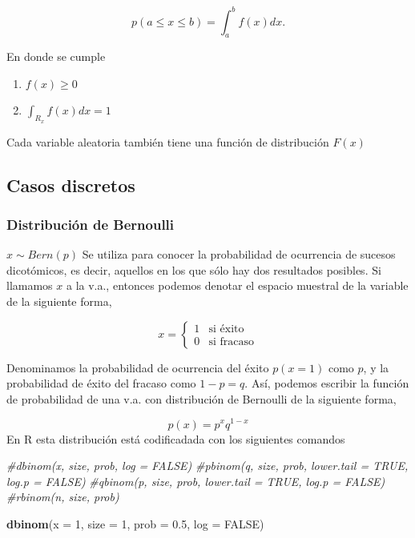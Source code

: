 \documentclass[]{article}
\newenvironment{Shaded}{\begin{snugshade}}{\end{snugshade}}
\newcommand{\CommentTok}[1]{\textcolor[rgb]{0.56,0.35,0.01}{\textit{#1}}}
\newcommand{\DataTypeTok}[1]{\textcolor[rgb]{0.13,0.29,0.53}{#1}}
\newcommand{\DecValTok}[1]{\textcolor[rgb]{0.00,0.00,0.81}{#1}}
\newcommand{\FloatTok}[1]{\textcolor[rgb]{0.00,0.00,0.81}{#1}}
\newcommand{\KeywordTok}[1]{\textcolor[rgb]{0.13,0.29,0.53}{\textbf{#1}}}
\newcommand{\NormalTok}[1]{#1}
\newcommand{\OtherTok}[1]{\textcolor[rgb]{0.56,0.35,0.01}{#1}}
\begin{document}
\[p(a \leq x \leq b) = \int_a^b f(x) dx.\]

En donde se cumple

\begin{enumerate}
\def\labelenumi{\arabic{enumi}.}
\item
  \(f(x) \geq 0\)
\item
  \(\int_{R_x} f(x) dx = 1\)
\end{enumerate}

Cada variable aleatoria también tiene una función de distribución
\(F(x)\)

\hypertarget{casos-discretos}{%
\subsection{Casos discretos}\label{casos-discretos}}

\hypertarget{distribucion-de-bernoulli}{%
\subsubsection{Distribución de
Bernoulli}\label{distribucion-de-bernoulli}}

\(x \sim Bern(p)\) Se utiliza para conocer la probabilidad de ocurrencia
de sucesos dicotómicos, es decir, aquellos en los que sólo hay dos
resultados posibles. Si llamamos \(x\) a la v.a., entonces podemos
denotar el espacio muestral de la variable de la siguiente forma,

\begin{equation}
x = 
\begin{cases} 
1 & \text{si } \mathrm{éxito} \\
0 & \text{si } \mathrm{fracaso}
\end{cases}
\end{equation}

Denominamos la probabilidad de ocurrencia del éxito \(p(x=1)\) como
\(p\), y la probabilidad de éxito del fracaso como \(1-p=q\). Así,
podemos escribir la función de probabilidad de una v.a. con distribución
de Bernoulli de la siguiente forma,

\[p(x) = p^x q^{1-x}\] En R esta distribución está codificadada con los
siguientes comandos

\begin{Shaded}
\begin{Highlighting}[]
\CommentTok{#dbinom(x, size, prob, log = FALSE)}
\CommentTok{#pbinom(q, size, prob, lower.tail = TRUE, log.p = FALSE)}
\CommentTok{#qbinom(p, size, prob, lower.tail = TRUE, log.p = FALSE)}
\CommentTok{#rbinom(n, size, prob)}


\KeywordTok{dbinom}\NormalTok{(}\DataTypeTok{x =} \DecValTok{1}\NormalTok{,   }\DataTypeTok{size =} \DecValTok{1}\NormalTok{, }\DataTypeTok{prob =} \FloatTok{0.5}\NormalTok{, }\DataTypeTok{log =} \OtherTok{FALSE}\NormalTok{)}
\end{Highlighting}
\end{Shaded}
\end{document}
